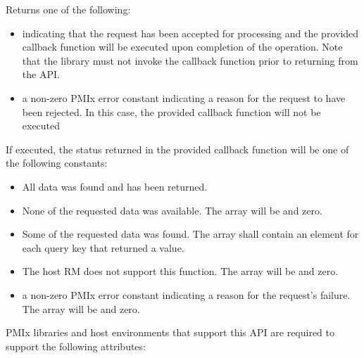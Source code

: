 Returns one of the following:

\begin{itemize}
\item {} indicating that the request has been accepted for processing and the provided callback function will be executed upon completion of the operation. Note that the library must not invoke the callback function prior to returning from the \ac{API}.
\item a non-zero \ac{PMIx} error constant indicating a reason for the request to have been rejected. In this case, the provided callback function will not be executed
\end{itemize}

If executed, the status returned in the provided callback function will be one of the following constants:

\begin{itemize}
\item {} All data was found and has been returned.

\item {} None of the requested data was available.
The  array will be  and  zero.

\item {} Some of the requested data was found.
The  array shall contain an element for each query key that returned a value.

\item {} The host \ac{RM} does not support this function. The  array will be  and  zero.

\item a non-zero \ac{PMIx} error constant indicating a reason for the request's failure. The  array will be  and  zero.
\end{itemize}

\reqattrstart
\ac{PMIx} libraries and host environments that support this \ac{API} are required to support the following attributes:


